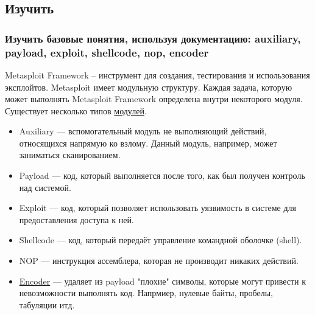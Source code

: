 \documentclass[10pt,a4paper,titlepage]{article}
\begin{document}
\subsection{Изучить}
\subsubsection{Изучить базовые понятия, используя документацию: auxiliary, payload, exploit, shellcode, nop, encoder}
Metasploit Framework – инструмент для создания, тестирования и использования эксплойтов. Metasploit имеет модульную структуру. Каждая задача, которую может выполнять Metasploit Framework определена внутри некоторого модуля. Существует несколько типов \href{https://help.rapid7.com/metasploit/index.html#framework/gsg-msf.html%3FTocPath%3DWorking%2520with%2520the%2520Framework%7C_____0}{модулей}.

\begin{itemize}
\item Auxiliary — вспомогательный модуль не выполняющий действий, относящихся напрямую ко взлому. Данный модуль, например, может заниматься сканированием.
\item Payload — код, который выполняется после того, как был получен контроль над системой.
\item Exploit — код, который позволяет использовать уязвимость в системе для предоставления доступа к ней.
\item Shellcode — код, который передаёт управление командной оболочке (shell). 
\item NOP — инструкция ассемблера, которая не производит никаких действий. 
\item \href{https://help.rapid7.com/metasploit/index.html#payloads/payload-generator.html?Highlight=encoder}{Encoder} — удаляет из payload "плохие" символы, которые могут привести к невозможности выполнять код. Напрмиер, нулевые байты, пробелы, табуляции итд.
\end{itemize}
\end{document}
